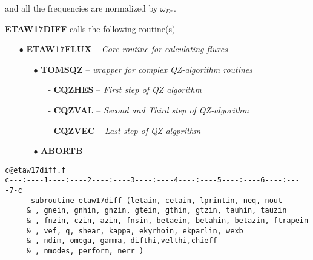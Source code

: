 and all the frequencies are normalized by $ \omega_{De} $.
\vspace{0.5cm}
{\parindent 0cm

 {\bf ETAW17DIFF} calls the following routine(s)}
\begin{itemize}
   \item[{\large$\bullet$}] {\bf ETAW17FLUX} -- {\em Core routine for calculating fluxes } 
   \begin{itemize}
       \item[{\normalsize $\bullet$}]
             {\bf TOMSQZ} -- {\em wrapper for complex QZ-algorithm routines} 
        \begin{itemize}
           \item[-]{\bf CQZHES} -- {\em First step of QZ algorithm}
           \item[-]{\bf CQZVAL} -- {\em Second and Third step of QZ-algorithm}
           \item[-] {\bf CQZVEC} -- {\em Last step of QZ-algprithm}
       \end{itemize}
       \item [{\normalsize$\bullet$}]{\bf ABORTB}
   \end{itemize}
\end{itemize}
\newpage
\begin{verbatim}
c@etaw17diff.f
c---:----1----:----2----:----3----:----4----:----5----:----6----:----7-c
      subroutine etaw17diff (letain, cetain, lprintin, neq, nout
     & , gnein, gnhin, gnzin, gtein, gthin, gtzin, tauhin, tauzin
     & , fnzin, czin, azin, fnsin, betaein, betahin, betazin, ftrapein
     & , vef, q, shear, kappa, ekyrhoin, ekparlin, wexb
     & , ndim, omega, gamma, difthi,velthi,chieff 
     & , nmodes, perform, nerr )
\end{verbatim}
\renewcommand{\arraystretch}{1.0}
